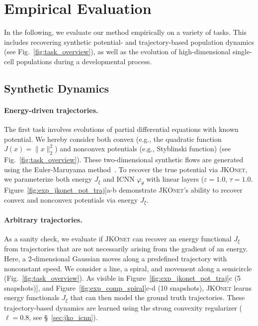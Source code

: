 \section{Empirical Evaluation} \label{sec:jkonet_evaluation}
In the following, we evaluate our method empirically on a variety of tasks. This includes recovering synthetic potential- and trajectory-based population dynamics (see Fig.~\ref{fig:task_overview}), as well as the evolution of high-dimensional single-cell populations during a developmental process. 

\subsection{Synthetic Dynamics}
\label{sec:jkonet_synthetic}

\paragraph{Energy-driven trajectories.} The first task involves evolutions of partial differential equations with known potential. We hereby consider both convex (e.g., the quadratic function $J(x) = \|x\|^2_2$) and nonconvex potentials (e.g., Styblinski function) (see Fig.~\ref{fig:task_overview}). These two-dimensional synthetic flows are generated using the Euler-Maruyama method~\citep{kloeden1992stochastic}. 
To recover the true potential via \textsc{JKOnet}, we parameterize both energy $J_\xi$ and ICNN $\varphi_\theta$ with linear layers ($\varepsilon = 1.0$, $\tau = 1.0$.
Figure~\ref{fig:exp_jkonet_pot_traj}a-b demonstrate \textsc{JKOnet}'s ability to recover convex and nonconvex potentials via energy $J_\xi$.

\paragraph{Arbitrary trajectories.}
As a sanity check, we evaluate if \textsc{JKOnet} can recover an energy functional $J_\xi$ from trajectories that are not necessarily arising from the gradient of an energy. Here, a 2-dimensional Gaussian moves along a predefined trajectory with nonconstant speed. 
We consider a line, a spiral, and movement along a semicircle (Fig.~\ref{fig:task_overview}). As visible in Figure~\ref{fig:exp_jkonet_pot_traj}c (5 snapshots)], and Figure~\ref{fig:exp_comp_spiral}c-d (10 snapshots), \textsc{JKOnet} learns energy functionals $J_\xi$ that can then model the ground truth trajectories.
These trajectory-based dynamics are learned using the strong convexity regularizer ($\ell=0.8$, see \S~\ref{sec:jko_icnn}).

